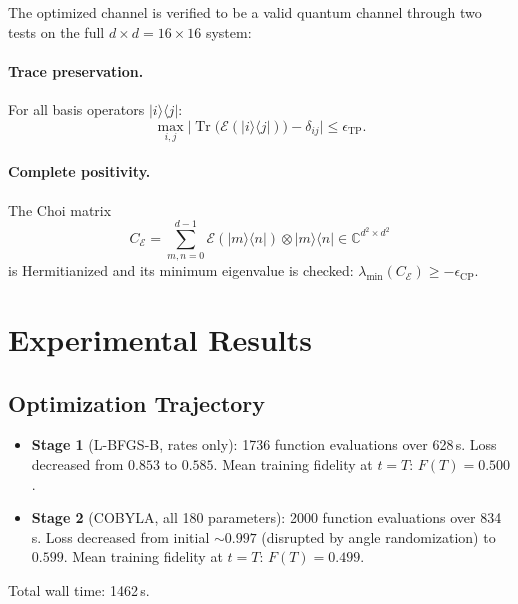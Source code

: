 \documentclass[11pt,a4paper]{article}
\newcommand{\ket}[1]{\lvert #1 \rangle}
\newcommand{\bra}[1]{\langle #1 \rvert}
\newcommand{\tr}{\operatorname{Tr}}
\newcommand{\C}{\mathbb{C}}
\begin{document}
The optimized channel is verified to be a valid quantum channel
through two tests on the full $d\times d = 16\times 16$ system:

\paragraph{Trace preservation.}
For all basis operators $\ket{i}\bra{j}$:
\begin{equation}
  \max_{i,j}\bigl|\tr\bigl(\mathcal{E}(\ket{i}\bra{j})\bigr) - \delta_{ij}\bigr|
  \le \epsilon_{\mathrm{TP}}.
\end{equation}

\paragraph{Complete positivity.}
The Choi matrix
\begin{equation}
  C_{\mathcal{E}}
  = \sum_{m,n=0}^{d-1}
    \mathcal{E}(\ket{m}\bra{n}) \otimes \ket{m}\bra{n}
  \in \C^{d^2\times d^2}
\end{equation}
is Hermitianized and its minimum eigenvalue is checked:
$\lambda_{\min}(C_{\mathcal{E}}) \ge -\epsilon_{\mathrm{CP}}$.

\section{Experimental Results}

\subsection{Optimization Trajectory}

\begin{itemize}
  \item \textbf{Stage 1} (L-BFGS-B, rates only):
    1736 function evaluations over 628\,s.
    Loss decreased from $0.853$ to $0.585$.
    Mean training fidelity at $t=T$: $F(T) = 0.500$.

  \item \textbf{Stage 2} (COBYLA, all 180 parameters):
    2000 function evaluations over 834\,s.
    Loss decreased from initial $\sim0.997$ (disrupted by angle
    randomization) to $0.599$.
    Mean training fidelity at $t=T$: $F(T) = 0.499$.
\end{itemize}

Total wall time: 1462\,s.
\end{document}

